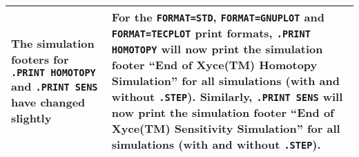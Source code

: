 {\begin{longtable}[h] {>{\raggedright\small}m{2in}|>{\raggedright\let\\\tabularnewline\small}m{3.5in}}
The simulation footers for \texttt{.PRINT HOMOTOPY} and \texttt{.PRINT SENS}
have changed slightly & For the \texttt{FORMAT=STD}, \texttt{FORMAT=GNUPLOT} 
and \texttt{FORMAT=TECPLOT} print formats, \texttt{.PRINT HOMOTOPY} will now print 
the simulation footer ``End of Xyce(TM) Homotopy Simulation'' for all simulations 
(with and without \texttt{.STEP}).  Similarly, \texttt{.PRINT SENS} will now
print the simulation footer ``End of Xyce(TM) Sensitivity Simulation'' for 
all simulations (with and without \texttt{.STEP}). \\ \hline

\end{longtable}
}
